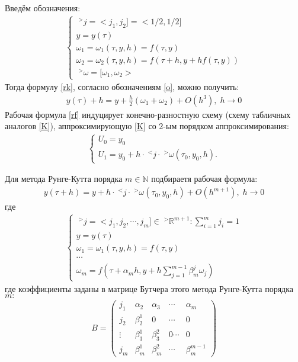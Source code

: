 \documentclass[__main__.tex]{subfiles}
\begin{document}
Введём обозначения:
\begin{gather}
	\begin{cases}
	\;^>j=<j_1,j_2]=<1/2,1/2]\\
	y=y(\tau)\\
	\omega_1=\omega_1(\tau,y,h)=f(\tau,y)\\
	\omega_2=\omega_2(\tau,y,h)=f(\tau+h,y+hf(\tau,y))\\
	\;^>\omega=[\omega_1,\omega_2>
	\end{cases}
	\label{o}
\end{gather}
Тогда формулу \ref{rk}, согласно обозначениям \ref{o}, можно получить:
\begin{gather}
	y(\tau)+h=y+\frac{h}{2}(\omega_1+\omega_2)+O(h^3),\; h\rightarrow0
	\label{rf}
\end{gather}
Рабочая формула \ref{rf} индуцирует конечно-разностную схему (схему табличных аналогов \ref{K}), аппроксимирующую \ref{K} со 2-ым порядком аппроксимирования:
\begin{gather*}
	\begin{cases}
	U_0=y_0\\
	U_1=y_0+h\cdot\;^<j\cdot\;^>\omega(\tau_0,y_0,h).
	\end{cases}
\end{gather*}

Для метода Рунге-Кутта порядка $m\in\mathbb{N}$ подбираетя рабочая формула:
\begin{gather*}
	y(\tau+h)=y+h\cdot\;^<j\cdot\;^>\omega(\tau_0,y_0,h)+O(h^{m+1}),\; h\rightarrow0
\end{gather*}
где
\begin{gather*}
	\begin{cases}
		\;^>j=<j_1,j_2,\cdots,j_m]\in\;^>\mathbb{R}^{m+1}:\sum\limits_{i=1}^m j_i=1\\
		y=y(\tau)\\
		\omega_1=\omega_1(\tau,y,h)=f(\tau,y)\\
		\cdots\\
		\omega_m=f(\tau+\alpha_mh,y+h\sum\limits_{j=1}^{m-1}\beta_m^j\omega_j)
	\end{cases}
\end{gather*}
где коэффициенты заданы в матрице Бутчера этого метода Рунге-Кутта порядка $m:$
\begin{gather*}
	B=
	\begin{pmatrix}
	j_1 & \alpha_2 & \alpha_3 & \cdots & \alpha_m \\
	j_2 & \beta_2^1 & 0 & \cdots & 0 \\
	\vdots & \beta_3^1 & \beta_3^2 & 0\cdots & 0 \\
	j_m & \beta_m^1 & \beta_m^2 & \cdots & \beta_m^{m-1}
	\end{pmatrix}
\end{gather*}
\end{document}
